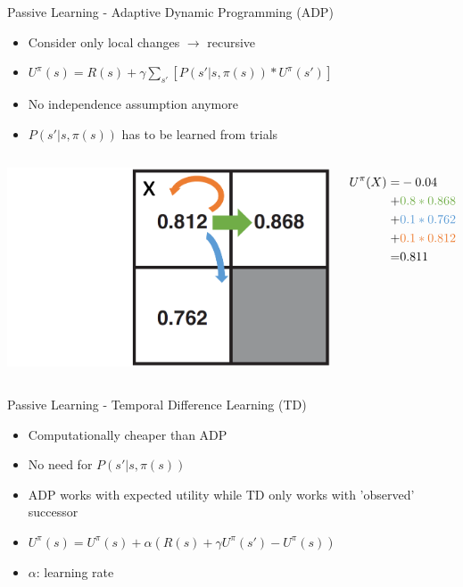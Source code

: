 \begin{frame}[c]{Passive Learning - Adaptive Dynamic Programming (ADP)}
\begin{itemize}
	\item Consider only local changes $\rightarrow$ recursive
	\item $U^{\pi}(s)=R(s)+\gamma\sum_{s'}[P(s'|s,\pi(s))*U^{\pi}(s')]$
	\item No independence assumption anymore
	\item $P(s'|s,\pi(s))$ has to be learned from trials
\end{itemize}
\pause
\begin{columns}
		\begin{center}
			\includegraphics[width=0.9\linewidth]{img-elias/ADP_example_passive.png}
		\end{center}
		\begin{align*}
			U^{\pi}(X)=&-0.04\\
			+&\color{PPgreen}0.8*0.868\\
			+&\color{PPblue}0.1*0.762\\
			+&\color{PPorange}0.1*0.812\\
			=&0.811
		\end{align*}
\end{columns}
\end{frame}


\begin{frame}[c]{Passive Learning - Temporal Difference Learning (TD)}
	\begin{itemize}
		\item Computationally cheaper than ADP
		\item No need for $P(s'|s,\pi(s))$
		\item ADP works with expected utility while
			  TD only works with 'observed' successor
		\item $U^{\pi}(s)=U^{\pi}(s)+\alpha (R(s)+\gamma U^{\pi}(s')-U^{\pi}(s))$
		\item $\alpha$: learning rate
	\end{itemize}
\end{frame}

